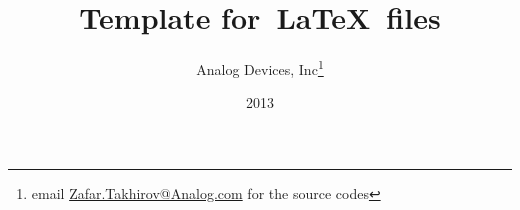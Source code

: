 %  

\documentclass[12pt]{article} %




\title{Template for~\LaTeX~files}
\date{2013}
\author{ 
  Analog Devices, Inc\thanks{email \href{mailto:Zafar.Takhirov@Analog.com}{Zafar.Takhirov@Analog.com} 
    for the source codes}
}


        \maketitle
        
        \section *{Motivation}
        \label{sec:motivation}
        I write a lot of documents, so why not having a template and making all of them look the same?
        
        \pagebreak
        \tableofcontents
        
